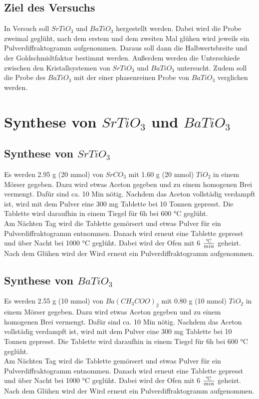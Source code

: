 \documentclass[12pt, a4paper]{article}
\begin{document}
\subsection{Ziel des Versuchs}
{
In Versuch soll $SrTiO_3$ und $BaTiO_3$ hergestellt werden. Dabei wird die Probe zweimal geglüht, nach dem erstem
und dem zweiten Mal glühen wird jeweils ein Pulverdiffraktogramm aufgenommen. Daraus soll dann die Halbwertsbreite und 
der Goldschmidtfaktor bestimmt werden. Außerdem werden die Unterschiede zwischen den Kristallsystemen von $SrTiO_3$ und $BaTiO_3$ 
untersucht. Zudem soll die Probe des $BaTiO_3$ mit der einer phasenreinen Probe von $BaTiO_3$ verglichen werden.\cite{Skript}
}

\newpage
\section{\texorpdfstring{Synthese von $SrTiO_3$ und $BaTiO_3$}{Synthese von SrTiO3 und BaTiO3}}
\subsection{\texorpdfstring{Synthese von $SrTiO_3$}{Synthese von SrTiO3}}
{Es werden 2.95 g (20 mmol) von $SrCO_3$ mit 1.60 g (20 mmol) $TiO_2$ in einem Mörser gegeben. 
Dazu wird etwas Aceton gegeben und 
zu einem homogenen Brei vermengt. Dafür sind ca. 10 Min nötig. Nachdem das Aceton vollstädig verdampft ist, wird mit dem Pulver eine 300 mg 
Tablette bei 10 Tonnen gepresst. Die Tablette wird daraufhin in einem Tiegel für 6h bei 600 °C geglüht.\\
Am Nächten Tag wird die Tablette gemörsert und etwas Pulver für ein Pulverdiffraktogramm entnommen. Danach wird erneut eine Tablette gepresst und über Nacht
bei 1000 °C geglüht. Dabei wird der Ofen mit 6 $\frac{\tccentigrade}{min}$ geheizt. Nach dem Glühen wird der Wird erneut ein Pulverdiffraktogramm aufgenommen.
}
\subsection{\texorpdfstring{Synthese von $BaTiO_3$}{Synthese von BaTiO3}}
{
Es werden 2.55 g (10 mmol) von $Ba(CH_3COO)_2$ mit 0.80 g (10 mmol) $TiO_2$ in einem Mörser gegeben.
Dazu wird etwas Aceton gegeben und 
zu einem homogenen Brei vermengt. Dafür sind ca. 10 Min nötig. Nachdem das Aceton vollstädig verdampft ist, wird mit dem Pulver eine 300 mg 
Tablette bei 10 Tonnen gepresst. Die Tablette wird daraufhin in einem Tiegel für 6h bei 600 °C geglüht.\\
Am Nächten Tag wird die Tablette gemörsert und etwas Pulver für ein Pulverdiffraktogramm entnommen. Danach wird erneut eine Tablette gepresst und über Nacht
bei 1000 °C geglüht. Dabei wird der Ofen mit 6 $\frac{\tccentigrade}{min}$ geheizt. Nach dem Glühen wird der Wird erneut ein Pulverdiffraktogramm aufgenommen.
}
\end{document}
